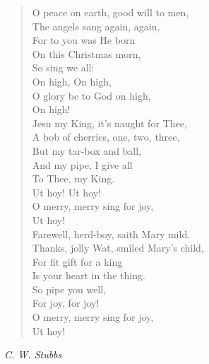 \begin{verse}
O peace on earth, good will to men,\\
The angels sang again, again,\\
\hspace*{2em}For to you was He born\\
\hspace*{2em}On this Christmas morn,\\
\hspace*{4em}So sing we all:\\
\hspace*{6em}On high, On high,\\
\hspace*{2em}O glory be to God on high,\\
\hspace*{6em}On high!\\[0.7em]

Jesu my King, it's naught for Thee,\\
A bob of cherries, one, two, three,\\
\hspace*{2em}But my tar-box and ball,\\
\hspace*{2em}And my pipe, I give all\\
\hspace*{4em}To Thee, my King.\\
\hspace*{6em}Ut hoy! Ut hoy!\\
\hspace*{2em}O merry, merry sing for joy,\\
\hspace*{6em}Ut hoy!\\[0.7em]

Farewell, herd-boy, saith Mary mild.\\
Thanks, jolly Wat, smiled Mary's child,\\
\hspace*{2em}For fit gift for a king\\
\hspace*{2em}Is your heart in the thing.\\
\hspace*{4em}So pipe you well,\\
\hspace*{6em}For joy, for joy!\\
\hspace*{2em}O merry, merry sing for joy,\\
\hspace*{6em}Ut hoy!%
\end{verse}

\vspace{0.5\baselineskip}
\noindent\textit{C. W. Stubbs}

\newpage
